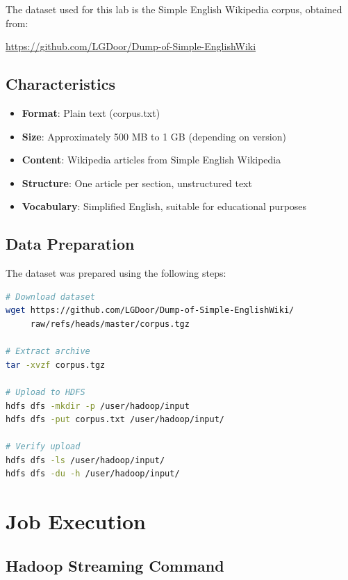 \documentclass[11pt,a4paper]{article}
\begin{document}
The dataset used for this lab is the Simple English Wikipedia corpus, obtained from:

\begin{center}
\url{https://github.com/LGDoor/Dump-of-Simple-EnglishWiki}
\end{center}

\subsection{Characteristics}

\begin{itemize}
    \item \textbf{Format}: Plain text (corpus.txt)
    \item \textbf{Size}: Approximately 500 MB to 1 GB (depending on version)
    \item \textbf{Content}: Wikipedia articles from Simple English Wikipedia
    \item \textbf{Structure}: One article per section, unstructured text
    \item \textbf{Vocabulary}: Simplified English, suitable for educational purposes
\end{itemize}

\subsection{Data Preparation}

The dataset was prepared using the following steps:

\begin{lstlisting}[language=bash, caption=Dataset Preparation Commands]
# Download dataset
wget https://github.com/LGDoor/Dump-of-Simple-EnglishWiki/
     raw/refs/heads/master/corpus.tgz

# Extract archive
tar -xvzf corpus.tgz

# Upload to HDFS
hdfs dfs -mkdir -p /user/hadoop/input
hdfs dfs -put corpus.txt /user/hadoop/input/

# Verify upload
hdfs dfs -ls /user/hadoop/input/
hdfs dfs -du -h /user/hadoop/input/
\end{lstlisting}

\section{Job Execution}

\subsection{Hadoop Streaming Command}
\end{document}
